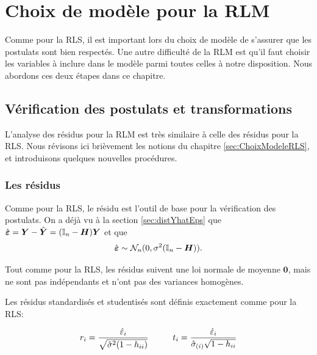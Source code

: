 \chapter{Choix de modèle pour la RLM}
\label{sec:ChoixModeleRLM}

Comme pour la RLS, il est important lors du choix de modèle de s'assurer que les postulats sont bien respectés. Une autre difficulté de la RLM est qu'il faut choisir les variables à inclure dans le modèle parmi toutes celles à notre disposition. Nous abordons ces deux étapes dans ce chapitre.

\section{Vérification des postulats et transformations}

L'analyse des résidus pour la RLM est très similaire à celle des résidus pour la RLS. Nous révisons ici brièvement les notions du chapitre \ref{sec:ChoixModeleRLS}, et introduisons quelques nouvelles procédures.

\subsection{Les résidus}

Comme pour la RLS, le résidu est l'outil de base pour la vérification des postulats. On a déjà vu à la section \ref{sec:distYhatEps} que $\hat{\mbox{\boldmath$\varepsilon$\unboldmath}}=\mbox{\boldmath$Y$\unboldmath}-\hat{\mbox{\boldmath$Y$\unboldmath}}=(\mbox{\boldmath$\mathbb{I}$\unboldmath}_n-\mbox{\boldmath$H$\unboldmath})\mbox{\boldmath$Y$\unboldmath}$ et que
\begin{eqnarray*}
	\hat{\mbox{\boldmath$\varepsilon$\unboldmath}} \sim \mathcal{N}_n(0, \sigma^2(\mbox{\boldmath$\mathbb{I}$\unboldmath}_n-\mbox{\boldmath$H$\unboldmath})).
\end{eqnarray*}

Tout comme pour la RLS, les résidus suivent une loi normale de moyenne $\bm{0}$, mais ne sont pas indépendants et n'ont pas des variances homogènes.

Les résidus standardisés et studentisés sont définis exactement comme pour la RLS:

$$r_i = \dfrac{\hat\varepsilon_i}{\sqrt{\hat\sigma^2(1-h_{ii})}}
\hspace{1cm}
t_i={\hat\varepsilon_i\over \hat{\sigma}_{(i)} \sqrt{1-h_{ii}}}$$



